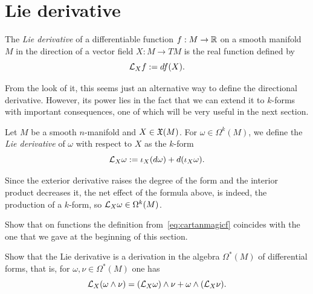 \section{Lie derivative}

\begin{definition}
	The \emph{Lie derivative} of a differentiable function $f:M\to\mathbb{R}$ on a smooth manifold $M$ in the direction of a vector field $X:M\to TM$ is the real function defined by
	\begin{equation}
		\mathcal{L}_X f := df(X).
	\end{equation}
\end{definition}

From the look of it, this seems just an alternative way to define the directional derivative.
However, its power lies in the fact that we can extend it to $k$-forms with important consequences, one of which will be very useful in the next section.

\begin{definition}
	Let $M$ be a smooth $n$-manifold and $X\in\mathfrak{X}(M)$.
	For $\omega\in\Omega^k(M)$, we define the \emph{Lie derivative} of $\omega$ with respect to $X$ as the $k$-form
	\begin{equation}\label{eq:cartanmagicf}
		\mathcal{L}_X\omega := \iota_X (d\omega) + d(\iota_X\omega).
	\end{equation}
\end{definition}

Since the exterior derivative raises the degree of the form and the interior product decreases it, the net effect of the formula above, is indeed, the production of a $k$-form, so $\mathcal{L}_X\omega \in \Omega^k(M)$.

\begin{exercise}
	Show that on functions the definition from~\eqref{eq:cartanmagicf} coincides with the one that we gave at the beginning of this section.
\end{exercise}

\begin{exercise}\label{exe:liederandwedge}
	Show that the Lie derivative is a derivation in the algebra $\Omega^*(M)$ of differential forms, that is, for $\omega,\nu\in\Omega^*(M)$ one has
	\begin{equation}
		\mathcal{L}_X(\omega\wedge\nu) = (\mathcal{L}_X\omega)\wedge\nu + \omega\wedge(\mathcal{L}_X \nu).
	\end{equation}
\end{exercise}

